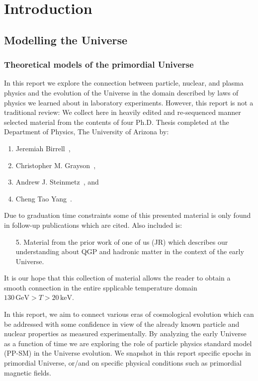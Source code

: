 \section{Introduction}
\subsection{Modelling the Universe}\label{ssec:UniLab}
\subsubsection{Theoretical models of the primordial Universe}
In this report we explore the connection between particle, nuclear, and plasma physics and the evolution of the Universe in the domain described by laws of physics we learned about in laboratory experiments. However, this report is not a traditional review: We collect here in heavily edited and re-sequenced manner selected material from the contents of four Ph.D. Thesis completed at the Department of Physics, The University of Arizona by:
\begin{enumerate}
\item Jeremiah Birrell~\cite{Birrell:2014ona},
\item Christopher M. Grayson~\cite{Grayson:2024okq},
\item Andrew J. Steinmetz~\cite{Steinmetz:2023ucp}, and
\item Cheng Tao Yang~\cite{Yang:2024ret}.
\end{enumerate}
Due to graduation time constraints some of this presented material is only found in follow-up publications which are cited. Also included is:
\begin{enumerate}
\item[5.] Material from the prior work of one of us (JR) which describes our understanding about QGP and hadronic matter in the context of the early Universe.
\end{enumerate}
It is our hope that this collection of material allows the reader to obtain a smooth connection in the entire spplicable temperature domain $130\,\mathrm{GeV}>T>20\,\mathrm{keV}$.

In this report, we aim to connect various eras of cosmological evolution which can be addressed with some confidence in view of the already known particle and nuclear properties as measured experimentally. By analyzing the early Universe as a function of time we are exploring the role of particle physics standard model (PP-SM) in the Universe evolution.  We snapshot in this report specific epochs in primordial Universe, or/and on specific physical conditions such as primordial magnetic fields.

